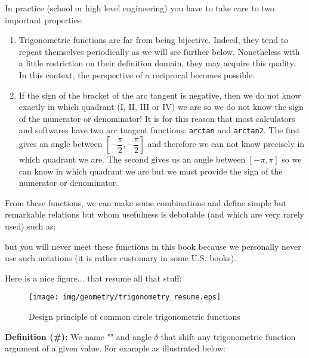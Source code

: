 In practice (school or high level engineering) you have to take care to two important properties: 
	\begin{enumerate}
		\item Trigonometric functions are far from being bijective. Indeed, they tend to repeat themselves periodically as we will see further below. Nonetheless with a little restriction on their definition domain, they may acquire this quality. In this context, the perspective of a reciprocal becomes possible.
		\item If the sign of the bracket of the arc tangent is negative, then we do not know exactly in which quadrant (I, II, III or IV) we are so we do not know the sign of the numerator or denominator! It is for this reason that most calculators and softwares have two arc tangent functions: \texttt{arctan} and \texttt{arctan2}. The first gives an angle between $\left[-\dfrac{\pi}{2},-\dfrac{\pi}{2}\right]$ and therefore we can not know precisely in which quadrant we are. The second gives us an angle between $\left[-\pi,\pi\right]$ so we can know in which quadrant we are but we must provide the sign of the numerator or denominator.
	\end{enumerate}

	From these functions, we can make some combinations and define simple but remarkable relations but whom usefulness is debatable (and which are very rarely used) such as:
	
	but you will never meet these functions in this book because we personally never use such notations (it is rather customary in some U.S. books).
	
	Here is a nice figure... that resume all that stuff:
	
	\begin{figure}[H]
	\centering
	\texttt{[image: img/geometry/trigonometry\_resume.eps]}
	\caption{Design principle of common circle trigonometric functions}
	\end{figure}
	
	\textbf{Definition (\#\mydef):} We name "" and angle $\delta$ that shift any trigonometric function argument of a given value. For example as illustrated below:
	
	\begin{figure}[H]
	\centering
	\end{figure}
	
